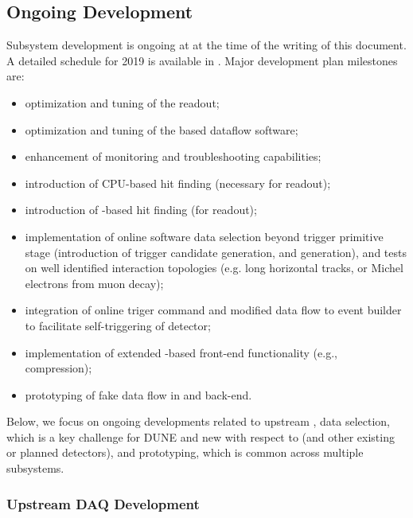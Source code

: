 \subsection{Ongoing Development}
\label{sec:sp-daq:design-validation}


Subsystem development is ongoing at  at the time of the
writing of this document. A detailed schedule for 2019 is available
in \cite{bib:docdb14095}. Major development plan milestones are:
\begin{itemize}
\item optimization and tuning of the  readout;
\item optimization and tuning of the  based dataflow software;
\item enhancement of monitoring and troubleshooting capabilities;
\item introduction of CPU-based hit finding (necessary for  readout);
\item introduction of -based hit finding (for  readout);
\item implementation of online software data selection beyond trigger
primitive stage (introduction of trigger candidate generation, and
 generation), and tests on well identified interaction
topologies (e.g. long horizontal tracks, or Michel electrons from muon decay);
\item integration of online triger command and modified data flow to event
builder to facilitate self-triggering of detector;
\item implementation of extended -based front-end functionality
(e.g., compression);
\item prototyping of fake  data flow in  and back-end.
\end{itemize}

Below, we focus on ongoing developments related to upstream ,
data selection, which is a key challenge for DUNE and new with respect
to  (and other existing or planned  detectors),
and  prototyping, which is common across multiple  subsystems.


\subsubsection{Upstream DAQ Development}

